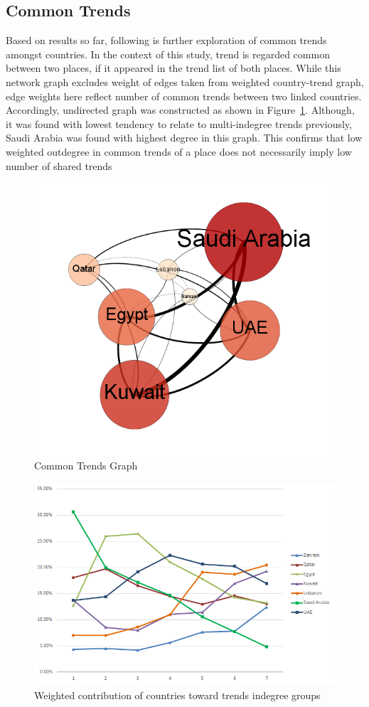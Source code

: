 \documentclass{llncs}
\begin{document}
\subsection{Common Trends}

Based on results so far, following is further exploration of common trends amongst countries. 
In the context of this study, trend is regarded common between two places, 
if it appeared in the trend list of both places. While this network graph excludes 
weight of edges taken from weighted country-trend graph, edge weights here reflect number 
of common trends between two linked countries. Accordingly, undirected graph was 
constructed as shown in Figure~\ref{fig:commontrendsgraph}. Although, it was found 
with lowest tendency to relate to multi-indegree trends previously, Saudi Arabia was 
found with highest degree in this graph. This confirms that low weighted outdegree 
in common trends of a place does not necessarily imply low number of shared trends 

\begin{figure}[htb]
\centering
\includegraphics[width=0.75\columnwidth]{images/CommonTrendsGraph.png}
\caption{Common Trends Graph}
\label{fig:commontrendsgraph}
\end{figure}

\begin{figure}[htb]
\centering
\includegraphics[width=0.8\columnwidth]{images/weightedcontributions.png}
\caption{Weighted contribution of countries toward trends indegree groups}
\label{fig:weightedcontributions}
\end{figure}
\end{document}
